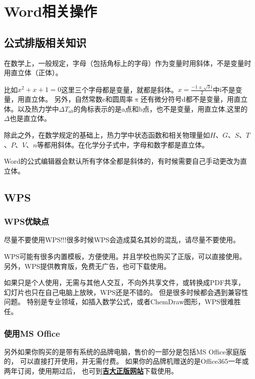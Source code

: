 \newpage
\section{Word相关操作}
\subsection{公式排版相关知识}
在数学上，一般规定，字母（包括角标上的字母）作为变量时用斜体，不是变量时用直立体（正体）。

比如$x^2+x+1=0$这里三个字母都是变量，就都是斜体。$x=\frac{-1\pm{}\sqrt{3}\mathrm{i}}{2}$中$\mathrm{i}$不是变量，用直立体。
另外，自然常数$\mathrm{e}$和圆周率$\uppi$还有微分符号$\mathrm{d}$都不是变量，用直立体。以及热力学中$\Delta{}T_{ab}$的角标表示的是a点和b点，也不是变量，用直立体,这里的$\Delta$也是直立体。

除此之外，在数学规定的基础上，热力学中状态函数和相关物理量如$H$、$G$、$S$、$T$、$P$、$V$、$n$等都用斜体。在化学分子式中，字母和数字都是直立体。

Word的公式编辑器会默认所有字体全都是斜体的，有时候需要自己手动更改为直立体。

\subsection{WPS}
\subsubsection{WPS优缺点}
尽量不要使用WPS!!!很多时候WPS会造成莫名其妙的混乱，请尽量不要使用。

WPS可能有很多内置模板，方便使用。并且学校也购买了正版，可以直接使用。
另外，WPS提供教育版，免费无广告，也可下载使用。

如果只是个人使用，无需与其他人交互，不向外共享文件，或转换成PDF共享，
幻灯片也只在自己电脑上放映，WPS还是不错的。
但是很多时候都会遇到兼容性问题。
特别是专业领域，如插入数学公式，或者ChemDraw图形，WPS很难胜任。

\subsubsection{使用MS Office} 

另外如果你购买的是带有系统的品牌电脑，售价的一部分是包括MS Office家庭版的，
可以直接打开使用，并无需付费。
如果你的品牌机赠送的是Office365一年或两年订阅，使用期过后，
也可到\textbf{\textcolor{blue}{\href{https://zbhrj1.jlu.edu.cn/download/office2021.html}{吉大正版网站}}}下载使用。

